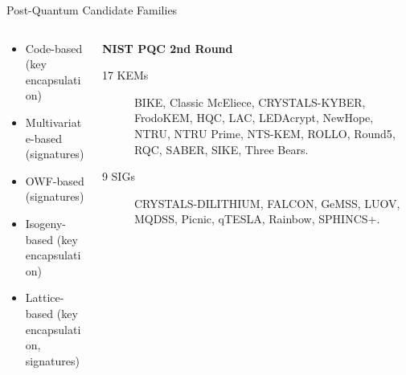 \documentclass[xcolor=table,10pt,aspectratio=169]{beamer}
\begin{document}
\begin{frame}[label={sec:org17e357e}]{Post-Quantum Candidate Families}
\begin{columns}[t]
\begin{column}{0.4\columnwidth}
\begin{itemize}
\item \alert<1>{Code-based (key encapsulation)}
\item \alert<2>{Multivariate-based (signatures)}
\item \alert<3>{OWF-based (signatures)}
\item \alert<4>{Isogeny-based (key encapsulation)}
\item \alert<5-7>{Lattice-based} (\alert<5,7>{key encapsulation}, \alert<6,7>{signatures})
\end{itemize}
\end{column}

\begin{column}{0.6\columnwidth}
\textbf{NIST PQC 2nd Round}

\begin{description}
\item[{17 KEMs}] \alert<1>{BIKE}, \alert<1>{Classic McEliece}, \alert<5,7>{CRYSTALS-KYBER}, \alert<5,7>{FrodoKEM}, \alert<1>{HQC}, \alert<5,7>{LAC}, \alert<1>{LEDAcrypt}, \alert<5,7>{NewHope}, \alert<5,7>{NTRU}, \alert<5,7>{NTRU Prime}, \alert<1>{NTS-KEM}, \alert<1>{ROLLO}, \alert<5,7>{Round5}, \alert<1>{RQC}, \alert<5,7>{SABER}, \alert<4>{SIKE}, \alert<5,7>{Three Bears}.

\item[{9 SIGs}] \alert<6,7>{CRYSTALS-DILITHIUM}, \alert<6,7>{FALCON}, \alert<2>{GeMSS}, \alert<2>{LUOV}, \alert<2>{MQDSS}, \alert<3>{Picnic}, \alert<6,7>{qTESLA}, \alert<2>{Rainbow}, \alert<3>{SPHINCS+}.
\end{description}
\end{column}
\end{columns}
\end{frame}
\end{document}
